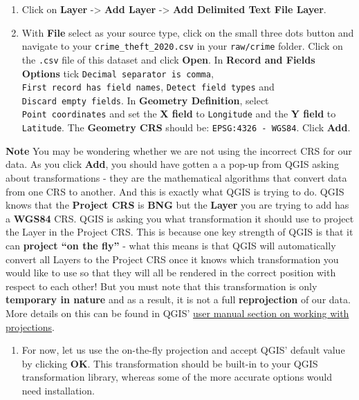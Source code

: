 \documentclass[
]{book}
\providecommand{\tightlist}{%
  \setlength{\itemsep}{0pt}\setlength{\parskip}{0pt}}
\begin{document}
\begin{enumerate}
\def\labelenumi{\arabic{enumi}.}
\item
  Click on \textbf{Layer} -\textgreater{} \textbf{Add Layer} -\textgreater{} \textbf{Add Delimited Text File Layer}.
\item
  With \textbf{File} select as your source type, click on the small three dots button and navigate to your \texttt{crime\_theft\_2020.csv} in your \texttt{raw/crime} folder. Click on the \texttt{.csv} file of this dataset and click \textbf{Open}. In \textbf{Record and Fields Options} tick \texttt{Decimal\ separator\ is\ comma}, \texttt{First\ record\ has\ field\ names}, \texttt{Detect\ field\ types} and \texttt{Discard\ empty\ fields}. In \textbf{Geometry Definition}, select \texttt{Point\ coordinates} and set the \textbf{X field} to \texttt{Longitude} and the \textbf{Y field} to \texttt{Latitude}. The \textbf{Geometry CRS} should be: \texttt{EPSG:4326\ -\ WGS84}. Click \textbf{Add}.
\end{enumerate}

\textbf{Note}
You may be wondering whether we are not using the incorrect CRS for our data. As you click \textbf{Add}, you should have gotten a a pop-up from QGIS asking about transformations - they are the mathematical algorithms that convert data from one CRS to another. And this is exactly what QGIS is trying to do. QGIS knows that the \textbf{Project CRS} is \textbf{BNG} but the \textbf{Layer} you are trying to add has a \textbf{WGS84} CRS. QGIS is asking you what transformation it should use to project the Layer in the Project CRS. This is because one key strength of QGIS is that it can \textbf{project ``on the fly''} - what this means is that QGIS will automatically convert all Layers to the Project CRS once it knows which transformation you would like to use so that they will all be rendered in the correct position with respect to each other! But you must note that this transformation is only \textbf{temporary in nature} and as a result, it is not a full \textbf{reprojection} of our data. More details on this can be found in QGIS' \href{https://docs.qgis.org/3.16/en/docs/user_manual/working_with_projections/working_with_projections.html}{user manual section on working with projections}.

\begin{enumerate}
\def\labelenumi{\arabic{enumi}.}
\setcounter{enumi}{2}
\tightlist
\item
  For now, let us use the on-the-fly projection and accept QGIS' default value by clicking \textbf{OK}. This transformation should be built-in to your QGIS transformation library, whereas some of the more accurate options would need installation.
\end{enumerate}
\end{document}
